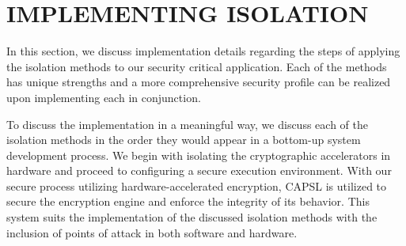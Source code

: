 \documentclass[sigconf]{acmart}
\theoremstyle{plain}
\theoremstyle{remark}
\begin{document}
%
%
%
%





\section{IMPLEMENTING ISOLATION} \label{sec:Implementation}
In this section, we discuss implementation details regarding the steps of applying the isolation methods to our security critical application. Each of the methods has unique strengths and a more comprehensive security profile can be realized upon implementing each in conjunction.

To discuss the implementation in a meaningful way, we discuss each of the isolation methods in the order they would appear in a bottom-up system development process. We begin with isolating the cryptographic accelerators in hardware and proceed to configuring a secure execution environment. With our secure process utilizing hardware-accelerated encryption, CAPSL is utilized to secure the encryption engine and enforce the integrity of its behavior. This system suits the implementation of the discussed isolation methods with the inclusion of points of attack in both software and hardware.
\end{document}
